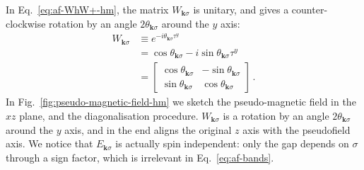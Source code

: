 In Eq.~\eqref{eq:af-WhW+-hm}, the matrix $W_{\mathbf{k}\sigma}$ is unitary, and gives a counter-clockwise rotation by an angle $2 \theta_{\mathbf{k}\sigma}$ around the $y$ axis:
\begin{align}
	W_{\mathbf{k}\sigma} &\equiv e^{-i \theta_{\mathbf{k}\sigma} \tau^y} \nonumber\\
	&= \cos \theta_{\mathbf{k}\sigma} -i \sin \theta_{\mathbf{k}\sigma} \tau^y \nonumber\\
	&= \begin{bmatrix}
		\cos \theta_{\mathbf{k}\sigma} & - \sin \theta_{\mathbf{k}\sigma} \\
		\sin \theta_{\mathbf{k}\sigma} & \cos \theta_{\mathbf{k}\sigma}
	\end{bmatrix} \, . \label{eq:af-hm-diagonalizer}
\end{align}
In Fig.~\ref{fig:pseudo-magnetic-field-hm} we sketch the pseudo-magnetic field in the $xz$ plane, and the diagonalisation procedure. $W_{\mathbf{k}\sigma}$ is a rotation by an angle $2\theta_{\mathbf{k}\sigma}$ around the $y$ axis, and in the end aligns the original $z$ axis with the pseudofield axis. We notice that $E_{\mathbf{k}\sigma}$ is actually spin independent: only the gap depends on $\sigma$ through a sign factor, which is irrelevant in Eq.~\eqref{eq:af-bands}.


